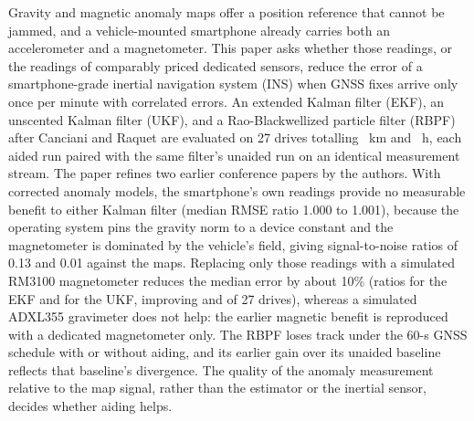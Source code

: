 Gravity and magnetic anomaly maps offer a position reference that cannot be jammed, and a vehicle-mounted smartphone already carries both an accelerometer and a magnetometer. This paper asks whether those readings, or the readings of comparably priced dedicated sensors, reduce the error of a smartphone-grade inertial navigation system (INS) when GNSS fixes arrive only once per minute with correlated errors. An extended Kalman filter (EKF), an unscented Kalman filter (UKF), and a Rao-Blackwellized particle filter (RBPF) after Canciani and Raquet are evaluated on 27 drives totalling \numdatasetkm~km and \numdatasethours~h, each aided run paired with the same filter's unaided run on an identical measurement stream. The paper refines two earlier conference papers by the authors. With corrected anomaly models, the smartphone's own readings provide no measurable benefit to either Kalman filter (median RMSE ratio 1.000 to 1.001), because the operating system pins the gravity norm to a device constant and the magnetometer is dominated by the vehicle's field, giving signal-to-noise ratios of 0.13 and 0.01 against the maps. Replacing only those readings with a simulated RM3100 magnetometer reduces the median error by about 10\% (ratios \numdedicatedekfmagratio{} for the EKF and \numdedicatedukfmagratio{} for the UKF, improving \numdedicatedekfmagbetter{} and \numdedicatedukfmagbetter{} of 27 drives), whereas a simulated ADXL355 gravimeter does not help: the earlier magnetic benefit is reproduced with a dedicated magnetometer only. The RBPF loses track under the 60-s GNSS schedule with or without aiding, and its earlier gain over its unaided baseline reflects that baseline's divergence. The quality of the anomaly measurement relative to the map signal, rather than the estimator or the inertial sensor, decides whether aiding helps.
